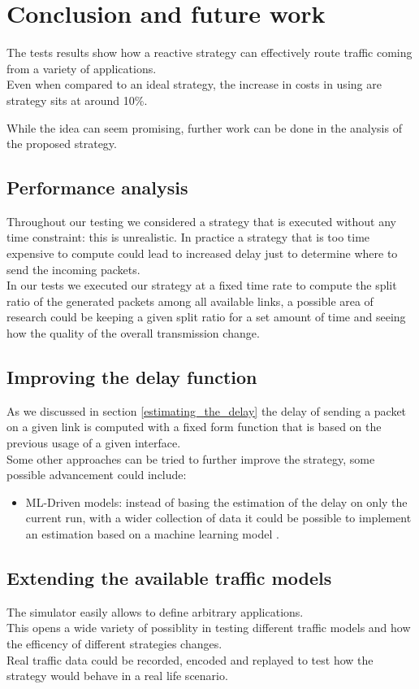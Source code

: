\section{Conclusion and future work}

The tests results show how a reactive strategy can effectively route traffic coming from a variety of applications. \\
Even when compared to an ideal strategy, the increase in costs in using are strategy sits at around 10\%.

While the idea can seem promising, further work can be done in the analysis of the proposed strategy.

\subsection{Performance analysis}
Throughout our testing we considered a strategy that is executed without any time constraint: this is unrealistic.
In practice a strategy that is too time expensive to compute could lead to increased delay just to determine where to send the incoming packets. \\
In our tests we executed our strategy at a fixed time rate to compute the split ratio of the generated packets among all available links, a possible area of research could be keeping a given split ratio for a set amount of time and seeing how the quality of the overall transmission change.


\subsection{Improving the delay function}
As we discussed in section \ref{estimating_the_delay} the delay of sending a packet on a given link is computed with a fixed form function that is based on the previous usage of a given interface. \\
Some other approaches can be tried to further improve the strategy, some possible advancement could include:
\begin{itemize}
	\item ML-Driven models: instead of basing the estimation of the delay on only the current run, with a wider collection of data it could be possible to implement an estimation based on a machine learning model \cite{ml_traffic_predictions}.
\end{itemize}


\subsection{Extending the available traffic models}
The simulator easily allows to define arbitrary applications. \\
This opens a wide variety of possiblity in testing different traffic models and how the efficency of different strategies changes. \\
Real traffic data could be recorded, encoded and replayed to test how the strategy would behave in a real life scenario.